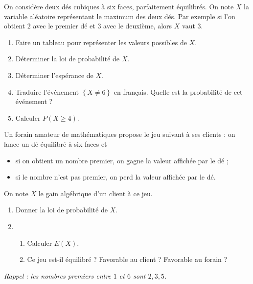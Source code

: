 \documentclass[11pt]{article}
\begin{document}
\begin{exo}[$4$ points]
On considère deux dés cubiques à six
faces, parfaitement équilibrés. On note $X$ la variable aléatoire
représentant le maximum des deux dés. Par exemple si l'on obtient $2$ avec le
premier dé et $3$ avec le deuxième, alors $X$ vaut $3$.
\begin{enumerate}
  \item Faire un tableau pour représenter les valeurs possibles de $X$.
  \item Déterminer la loi de probabilité de $X$.
  \item Déterminer l'espérance de $X$.
  \item Traduire l'événement $\left\{ X\neq 6 \right\}$ en français. Quelle est la
    probabilité de cet événement ?
  \item Calculer $P\left( X\geq 4 \right)$.
\end{enumerate}
\end{exo}

\newpage
\begin{exo}[$2$ points]
  Un forain amateur de mathématiques propose le jeu suivant à ses clients : on
  lance un dé équilibré à six faces et
  \begin{itemize}
    \item si on obtient un nombre premier, on gagne la valeur affichée par le dé ;
    \item si le nombre n'est pas premier, on perd la valeur affichée par le dé.
  \end{itemize}
  On note $X$ le gain algébrique d'un client à ce jeu.
  \begin{enumerate}
    \item Donner la loi de probabilité de $X$.
    \item \begin{enumerate}
        \item Calculer $E(X)$.
        \item Ce jeu est-il équilibré ? Favorable au client ? Favorable au
          forain ?
      \end{enumerate}
  \end{enumerate}
  \emph{Rappel : les nombres premiers entre $1$ et $6$ sont $2, 3, 5$.}
\end{exo}
\end{document}
